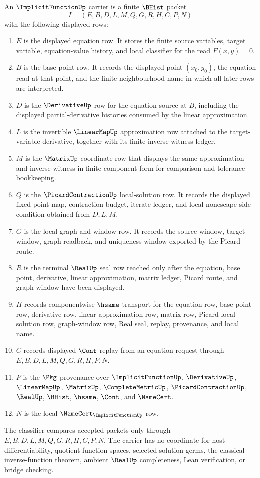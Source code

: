 \begin{definition}\label{def:implicit-function-carrier}
An $\ImplicitFunctionUp$ carrier is a finite $\BHist$ packet
$$
I=(E,B,D,L,M,Q,G,R,H,C,P,N)
$$
with the following displayed rows:
\begin{enumerate}
\item $E$ is the displayed equation row. It stores the finite source variables, target variable, equation-value history, and local classifier for the read $F(x,y)=0$.
\item $B$ is the base-point row. It records the displayed point $(x_0,y_0)$, the equation read at that point, and the finite neighbourhood name in which all later rows are interpreted.
\item $D$ is the $\DerivativeUp$ row for the equation source at $B$, including the displayed partial-derivative histories consumed by the linear approximation.
\item $L$ is the invertible $\LinearMapUp$ approximation row attached to the target-variable derivative, together with its finite inverse-witness ledger.
\item $M$ is the $\MatrixUp$ coordinate row that displays the same approximation and inverse witness in finite component form for comparison and tolerance bookkeeping.
\item $Q$ is the $\PicardContractionUp$ local-solution row. It records the displayed fixed-point map, contraction budget, iterate ledger, and local nonescape side condition obtained from $D,L,M$.
\item $G$ is the local graph and window row. It records the source window, target window, graph readback, and uniqueness window exported by the Picard route.
\item $R$ is the terminal $\RealUp$ seal row reached only after the equation, base point, derivative, linear approximation, matrix ledger, Picard route, and graph window have been displayed.
\item $H$ records componentwise $\hsame$ transport for the equation row, base-point row, derivative row, linear approximation row, matrix row, Picard local-solution row, graph-window row, Real seal, replay, provenance, and local name.
\item $C$ records displayed $\Cont$ replay from an equation request through $E,B,D,L,M,Q,G,R,H,P,N$.
\item $P$ is the $\Pkg$ provenance over $\ImplicitFunctionUp$, $\DerivativeUp$, $\LinearMapUp$, $\MatrixUp$, $\CompleteMetricUp$, $\PicardContractionUp$, $\RealUp$, $\BHist$, $\hsame$, $\Cont$, and $\NameCert$.
\item $N$ is the local $\NameCert_{\ImplicitFunctionUp}$ row.
\end{enumerate}
The classifier compares accepted packets only through $E,B,D,L,M,Q,G,R,H,C,P,N$. The carrier has no coordinate for host differentiability, quotient function spaces, selected solution germs, the classical inverse-function theorem, ambient $\RealUp$ completeness, Lean verification, or bridge checking.
\end{definition}

